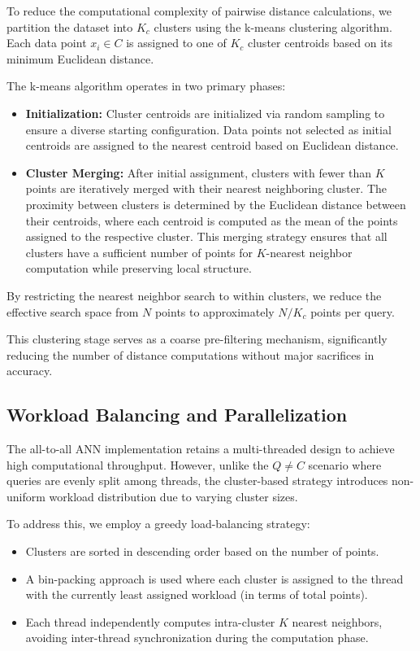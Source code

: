 \documentclass[conference]{IEEEtran}
\begin{document}
To reduce the computational complexity of pairwise distance calculations, we partition the dataset into $K_c$ clusters using the k-means clustering algorithm. Each data point $x_i \in C$ is assigned to one of $K_c$ cluster centroids based on its minimum Euclidean distance. 

The k-means algorithm operates in two primary phases:
\begin{itemize}
    \item \textbf{Initialization:} Cluster centroids are initialized via random sampling to ensure a diverse 
    starting configuration. Data points not selected as initial centroids are assigned to the nearest centroid 
    based on Euclidean distance.
    
    \item \textbf{Cluster Merging:} After initial assignment, clusters with fewer than $K$ points are iteratively
    merged with their nearest neighboring cluster. The proximity between clusters is determined by the Euclidean 
    distance between their centroids, where each centroid is computed as the mean of the points assigned to the 
    respective cluster. This merging strategy ensures that all clusters have a sufficient number of points for 
    $K$-nearest neighbor computation while preserving local structure.
\end{itemize}

By restricting the nearest neighbor search to within clusters, we reduce the effective search space from $N$ points 
to approximately $N/K_c$ points per query.

This clustering stage serves as a coarse pre-filtering mechanism, significantly reducing the number of distance 
computations without major sacrifices in accuracy.

\subsection{Workload Balancing and Parallelization}

The all-to-all ANN implementation retains a multi-threaded design to achieve high computational throughput. 
However, unlike the $Q \neq C$ scenario where queries are evenly split among threads, the cluster-based strategy
introduces non-uniform workload distribution due to varying cluster sizes.

To address this, we employ a greedy load-balancing strategy:
\begin{itemize}
    \item Clusters are sorted in descending order based on the number of points.
    \item A bin-packing approach is used where each cluster is assigned to the thread with the currently 
    least assigned workload (in terms of total points).
    \item Each thread independently computes intra-cluster $K$ nearest neighbors, avoiding inter-thread 
    synchronization during the computation phase.
\end{itemize}
\end{document}
